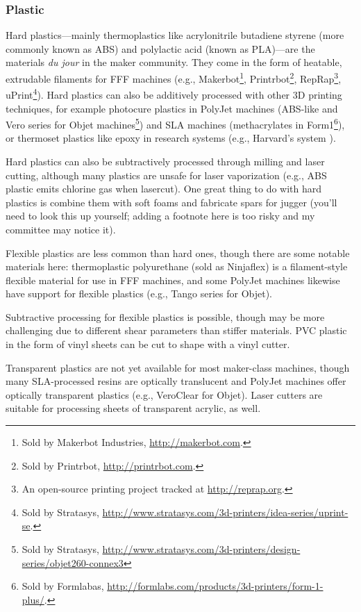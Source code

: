 \subsubsection{Plastic}

Hard plastics---mainly thermoplastics like acrylonitrile butadiene styrene (more commonly known as ABS) and polylactic acid (known as PLA)---are the materials \emph{du jour} in the maker community. They come in the form of heatable, extrudable filaments for FFF machines (e.g., Makerbot\footnote{Sold by Makerbot Industries, \url{http://makerbot.com}.}, Printrbot\footnote{Sold by Printrbot, \url{http://printrbot.com}.}, RepRap\footnote{An open-source printing project tracked at \url{http://reprap.org}.}, uPrint\footnote{Sold by Stratasys, \url{http://www.stratasys.com/3d-printers/idea-series/uprint-se}.}). Hard plastics can also be additively processed with other 3D printing techniques, for example photocure plastics in PolyJet machines (ABS-like and Vero series for Objet machines\footnote{Sold by Stratasys, \url{http://www.stratasys.com/3d-printers/design-series/objet260-connex3}}) and SLA machines (methacrylates in Form1\footnote{Sold by Formlabas, \url{http://formlabs.com/products/3d-printers/form-1-plus/}.}), or thermoset plastics like epoxy in research systems (e.g., Harvard's system \cite{compton-epoxy}).

Hard plastics can also be subtractively processed through milling and laser cutting, although many plastics are unsafe for laser vaporization (e.g., ABS plastic emits chlorine gas when lasercut). One great thing to do with hard plastics is combine them with soft foams and fabricate spars for jugger (you'll need to look this up yourself; adding a footnote here is too risky and my committee may notice it).

Flexible plastics are less common than hard ones, though there are some notable materials here: thermoplastic polyurethane (sold as Ninjaflex) is a filament-style flexible material for use in FFF machines, and some PolyJet machines likewise have support for flexible plastics (e.g., Tango series for Objet).

Subtractive processing for flexible plastics is possible, though may be more challenging due to different shear parameters than stiffer materials. PVC plastic in the form of vinyl sheets can be cut to shape with a vinyl cutter.

Transparent plastics are not yet available for most maker-class machines, though many SLA-processed resins are optically translucent and PolyJet machines offer optically transparent plastics (e.g., VeroClear for Objet). Laser cutters are suitable for processing sheets of transparent acrylic, as well.

